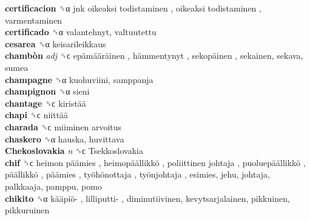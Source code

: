 \textbf{certificacion} ␝α   jnk oikeaksi todistaminen ,  oikeaksi todistaminen , varmentaminen  \\
\textbf{certificado} ␝α  valantehnyt, valtuutettu  \\
\textbf{cesarea} ␝α  keisarileikkaus  \\
\textbf{chambòn} \emph{adj}  ␝ϲ   epämääräinen ,  hämmentynyt ,  sekopäinen , sekainen, sekava, sumea  \\
\textbf{champagne} ␝α  kuohuviini, samppanja  \\
\textbf{champignon} ␝α  sieni  \\
\textbf{chantage} ␝ϲ   kiristää   \\
\textbf{chapi} ␝ϲ   niittää   \\
\textbf{charada} ␝ϲ   miiminen arvoitus   \\
\textbf{chaskero} ␝α  hauska, huvittava  \\
\textbf{Chekoslovakia} \emph{n}  ␝ϲ   Tsekkoslovakia   \\
\textbf{chif} ␝ϲ   heimon päämies ,  heimopäällikkö ,  poliittinen johtaja ,  puoluepäällikkö ,  päällikkö ,  päämies ,  työhönottaja ,  työnjohtaja , esimies, jehu, johtaja, palkkaaja, pamppu, pomo  \\
\textbf{chikito} ␝α   kääpiö- ,  lilliputti- , diminutiivinen, kevytsarjalainen, pikkuinen, pikkuruinen  \\
